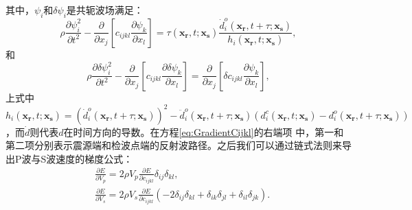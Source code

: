 其中，$\psi_i$和$\delta \psi_i$是共轭波场满足：
\begin{equation}
    \rho \frac{\partial \psi^2_i}{\partial t^2}  -
    \frac{\partial}{\partial x_j}\left[ 
        c_{ijkl}\frac{\partial \psi_{k}}{\partial
        x_l}\right]=\tau(\mathbf{x_r},t;\mathbf{x_s})\frac{\dot{d}^o_i(\mathbf{x_r},t+\tau;\mathbf{x_s})}{h_i(\mathbf{x_r},t;\mathbf{x_s})},
    \label{eq:AdjointWE} 
\end{equation}
和
\begin{equation}
    \rho \frac{\partial \delta \psi^2_i}{\partial t^2}  -
    \frac{\partial}{\partial x_j}\left[ 
        c_{ijkl}\frac{\partial \delta \psi_{k}}{\partial 
        x_l}\right]=\frac{\partial}{\partial x_j}\left[\delta c_{ijkl}\frac{\partial
        \psi_{k}}{\partial x_l}\right], 
    \label{eq:AdjointDeltaWE} 
\end{equation}
上式中$h_i(\mathbf{x_r},t;\mathbf{x_s})=(\dot{d}^o_i(\mathbf{x_r},t+\tau;\mathbf{x_s}))^2-\ddot{d}^o_i(\mathbf{x_r},t+\tau;\mathbf{x_s})
(d^c_i(\mathbf{x_r},t;\mathbf{x_s})-d^o_i(\mathbf{x_r},t+\tau;\mathbf{x_s}))$，而$\dot{d}$则代表$d$在时间方向的导数。在方程\eqref{eq:GradientCijkl}的右端项
中，第一和第二项分别表示震源端和检波点端的反射波路径。之后我们可以通过链式法则来导出P波与S波速度的梯度公式：
\begin{equation}
\begin{split}
    &\frac{\partial E}{\partial V_p}=2\rho V_p\frac{\partial E}{\partial
        c_{ijkl}}\delta_{ij}\delta_{kl}, \\
    &\frac{\partial E}{\partial V_s}=2\rho V_s\frac{\partial
    E}{\partial c_{ijkl}}(-2\delta_{ij}\delta_{kl}+\delta_{ik}\delta_{jl}+
    \delta_{il}\delta_{jk}).
\end{split}
    \label{eq:GradientVel}
\end{equation}
